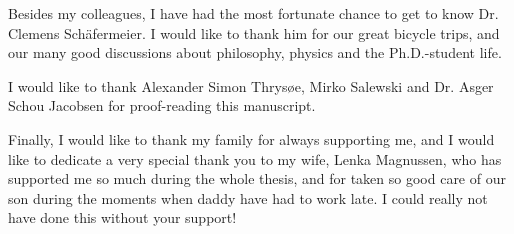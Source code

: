 Besides my colleagues, I have had the most fortunate chance to get to know Dr. Clemens Sch{\"a}fermeier.
I would like to thank him for our great bicycle trips, and our many good discussions about philosophy, physics and the Ph.D.-student life.

I would like to thank Alexander Simon Thrys{\o}e, Mirko Salewski and Dr.  Asger Schou Jacobsen for proof-reading this manuscript.

Finally, I would like to thank my family for always supporting me, and I would like to dedicate a very special thank you to my wife, Lenka Magnussen, who has supported me so much during the whole thesis, and for taken so good care of our son during the moments when daddy have had to work late.
I could really not have done this without your support!
